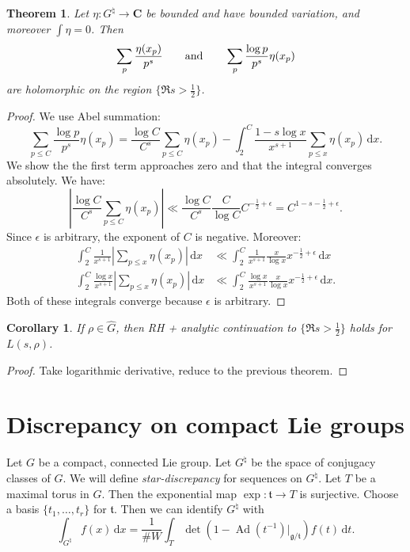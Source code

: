 \documentclass{article}
\DeclareMathOperator{\Ad}{Ad}
\newcommand{\bC}{\mathbf{C}}
\newcommand{\dd}{\mathrm{d}}
\newcommand{\fg}{\mathfrak{g}}
\newcommand{\ft}{\mathfrak{t}}
\newtheorem{theorem}[subsection]{Theorem}
\newtheorem{corollary}[subsection]{Corollary}
\theoremstyle{definition}
\begin{document}
\begin{theorem}
Let $\eta\colon G^\natural\to \bC$ be bounded and have bounded variation, and 
moreover $\int \eta = 0$. Then 
\[
	\sum_p\frac{\eta(x_p)}{p^s}
	\qquad \textnormal{and}\qquad
	\sum_p \frac{\log p}{p^s} \eta(x_p)
\]
are holomorphic on the region $\{\Re s>\frac 1 2\}$. 
\end{theorem}
\begin{proof}
We use Abel summation:
\[
	\sum_{p\leqslant C} \frac{\log p}{p^s} \eta(x_p) 
		= \frac{\log C}{C^s} \sum_{p\leqslant C} \eta(x_p) - \int_2^C \frac{1-s\log x}{x^{s+1}} \sum_{p\leqslant x} \eta(x_p)\, \dd x .
\]
We show the the first term approaches zero and that the integral converges 
absolutely. We have:
\[
	\left|\frac{\log C}{C^s} \sum_{p\leqslant C} \eta(x_p)\right| \ll \frac{\log C}{C^s} \frac{C}{\log C} C^{-\frac 1 2+\epsilon} = C^{1-s-\frac 1 2+\epsilon} .
\]
Since $\epsilon$ is arbitrary, the exponent of $C$ is negative. Moreover:
\begin{align*}
	\int_2^C \frac{1}{x^{s+1}} \left|\sum_{p\leqslant x} \eta(x_p)\right|\, \dd x 
		&\ll \int_2^C \frac{1}{x^{s+1}} \frac{x}{\log x} x^{-\frac 1 2 +\epsilon}\, \dd x \\
	\int_2^C \frac{\log x}{x^{s+1}} \left|\sum_{p\leqslant x} \eta(x_p)\right|\, \dd x 
		&\ll \int_2^C \frac{\log x}{x^{s+1}} \frac{x}{\log x} x^{-\frac 1 2 +\epsilon}\, \dd x .
\end{align*}
Both of these integrals converge because $\epsilon$ is arbitrary. 
\end{proof}

\begin{corollary}
If $\rho\in \widehat G$, then RH + analytic continuation to 
$\{\Re s>\frac 1 2\}$ holds for $L(s,\rho)$. 
\end{corollary}
\begin{proof}
Take logarithmic derivative, reduce to the previous theorem. 
\end{proof}





\section{Discrepancy on compact Lie groups}

Let $G$ be a compact, connected Lie group. Let $G^\natural$ be the space of 
conjugacy classes of $G$. We will define \emph{star-discrepancy} for sequences 
on $G^\natural$. Let $T$ be a maximal torus in $G$. Then the exponential map 
$\exp\colon \ft\to T$ is surjective. Choose a basis $\{t_1,\dots,t_r\}$ for 
$\ft$. Then we can identify $G^\natural$ with 
\[
	\int_{G^\natural} f(x)\, \dd x = \frac{1}{\# W}\int_T \det(1-\Ad(t^{-1})|_{\fg/\ft}) f(t)\, \dd t .
\]
\end{document}
